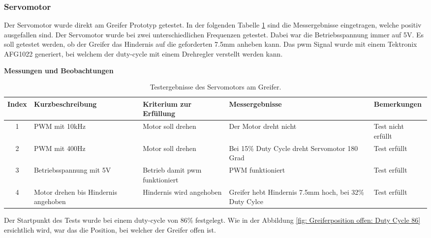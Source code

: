 \subsubsection*{Servomotor}


Der Servomotor wurde direkt am Greifer Prototyp getestet. In der folgenden Tabelle \ref{tab:testpunkte Servomotor} sind die Messergebnisse eingetragen, welche positiv ausgefallen sind. Der Servomotor wurde bei zwei unterschiedlichen Frequenzen getestet. Dabei war die Betriebsspannung immer auf 5V. Es soll getestet werden, ob der Greifer das Hindernis auf die geforderten 7.5mm anheben kann. Das \acrshort{pwm} Signal wurde mit einem Tektronix AFG1022 generiert, bei welchem der \gls{duty-cycle} mit einem Drehregler verstellt werden kann.

\textbf{Messungen und Beobachtungen}

\begin{table}[H]
\centering
\small
\begin{tabularx}{\textwidth}{|c|X|X|X|l|}
        \hline
        \textbf{Index} & \textbf{Kurzbeschreibung} & \textbf{Kriterium zur Erfüllung} & \textbf{Messergebnisse} & \textbf{Bemerkungen} \\
        \hline
        1 & PWM mit 10kHz & Motor soll drehen & Der Motor dreht nicht & Test nicht erfüllt \\ \hline
        2 & PWM mit 400Hz & Motor soll drehen & Bei 15\% Duty Cycle dreht Servomotor 180 Grad & Test erfüllt \\ \hline
        3 & Betriebsspannung mit 5V & Betrieb damit \acrshort{pwm} funktioniert  & PWM funktioniert & Test erfüllt\\ \hline
        4 & Motor drehen bis Hindernis angehoben & Hindernis wird angehoben & Greifer hebt Hindernis 7.5mm hoch, bei 32\% Duty Cylce & Test erfüllt \\ \hline
\end{tabularx}
    \caption{Testergebnisse des Servomotors am Greifer.}
\label{tab:testpunkte Servomotor}
\end{table}

\newpage

Der Startpunkt des Tests wurde bei einem \gls{duty-cycle} von 86\% festgelegt. Wie in der Abbildung \ref{fig: Greiferposition offen: Duty Cycle 86} ersichtlich wird, war das die Position, bei welcher der Greifer offen ist.

